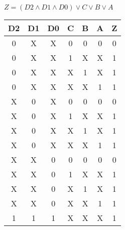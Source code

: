 \begin{center}
    {\(Z = (D2 \land D1 \land D0) \lor C \lor B \lor A \)}
    \begin{table}[h] %
        \begin{center}
            \begin{tabular}{|c|c|c|c|c|c||c|} \hline
            D2 & D1 & D0 & C & B & A & Z \\ \hline\hline
            0  & X  & X  & 0 & 0 & 0 & 0 \\ \hline
            0  & X  & X  & 1 & X & X & 1 \\ \hline
            0  & X  & X  & X & 1 & X & 1 \\ \hline
            0  & X  & X  & X & X & 1 & 1 \\ \hline
            X  & 0  & X  & 0 & 0 & 0 & 0 \\ \hline
            X  & 0  & X  & 1 & X & X & 1 \\ \hline
            X  & 0  & X  & X & 1 & X & 1 \\ \hline
            X  & 0  & X  & X & X & 1 & 1 \\ \hline
            X  & X  & 0  & 0 & 0 & 0 & 0 \\ \hline
            X  & X  & 0  & 1 & X & X & 1 \\ \hline
            X  & X  & 0  & X & 1 & X & 1 \\ \hline
            X  & X  & 0  & X & X & 1 & 1 \\ \hline
            1  & 1  & 1  & X & X & X & 1 \\ \hline
            \end{tabular}
        \end{center}
    \end{table}
\end{center}
